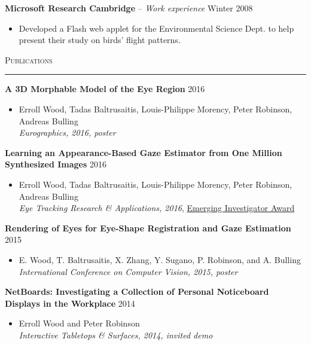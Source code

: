\documentclass{article}
\begin{document}
\textbf{Microsoft Research Cambridge} -- \emph{Work experience} \hfill Winter 2008 \\[-6mm]
\begin{itemize}
  \item[] Developed a Flash web applet for the Environmental Science Dept. to help present their study on birds' flight patterns.
\end{itemize} \bigskip

\textsc{Publications} \smallskip \hrule \smallskip

\textbf{A 3D Morphable Model of the Eye Region} \hfill 2016 \\[-6mm]
\begin{itemize}
  \item[] Erroll Wood, Tadas Baltrusaitis, Louis-Philippe Morency, Peter Robinson, Andreas Bulling \\
  \emph{Eurographics, 2016, poster}
\end{itemize} \smallskip

\textbf{Learning an Appearance-Based Gaze Estimator from One Million Synthesized Images} \hfill 2016 \\[-6mm]
\begin{itemize}
  \item[] Erroll Wood, Tadas Baltrusaitis, Louis-Philippe Morency, Peter Robinson, Andreas Bulling \\
  \emph{Eye Tracking Research \& Applications, 2016}, \underline{Emerging Investigator Award}
\end{itemize} \smallskip

\textbf{Rendering of Eyes for Eye-Shape Registration and Gaze Estimation} \hfill 2015 \\[-6mm]
\begin{itemize}
  \item[] E. Wood, T. Baltrusaitis, X. Zhang, Y. Sugano, P. Robinson, and A. Bulling \\
  \emph{International Conference on Computer Vision, 2015, poster}
\end{itemize} \smallskip

\textbf{NetBoards: Investigating a Collection of Personal Noticeboard Displays in the Workplace} \hfill 2014 \\[-6mm]
\begin{itemize}
  \item[] Erroll Wood and Peter Robinson \\
  \emph{Interactive Tabletops \& Surfaces, 2014, invited demo}
\end{itemize} \smallskip
\end{document}
